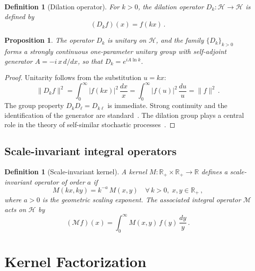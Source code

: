 \documentclass[12pt]{article}
\newtheorem{proposition}[theorem]{Proposition}
\newtheorem{definition}[theorem]{Definition}
\begin{document}
\begin{definition}[Dilation operator]\label{def:dilation}
For $k > 0$, the \emph{dilation operator} $D_k: \mathcal{H} \to \mathcal{H}$ is defined by
\begin{equation}\label{eq:dilation}
(D_k f)(x) = f(kx)\,.
\end{equation}
\end{definition}

\begin{proposition}\label{prop:unitary}
The operator $D_k$ is unitary on $\mathcal{H}$, and the family $\{D_k\}_{k>0}$ forms a strongly continuous one-parameter unitary group with self-adjoint generator $A = -i\, x\, d/dx$, so that $D_k = e^{iA\ln k}$.
\end{proposition}

\begin{proof}
Unitarity follows from the substitution $u = kx$:
\[
\|D_k f\|^2 = \int_0^\infty |f(kx)|^2\, \frac{dx}{x} = \int_0^\infty |f(u)|^2\, \frac{du}{u} = \|f\|^2\,.
\]
The group property $D_k D_\ell = D_{k\ell}$ is immediate. Strong continuity and the identification of the generator are standard~\cite{ReedSimon1978}. The dilation group plays a central role in the theory of self-similar stochastic processes~\cite{EmbrechtsMaejima2002}.
\end{proof}


\subsection{Scale-invariant integral operators}

\begin{definition}[Scale-invariant kernel]\label{def:scaleinv}
A kernel $M: \mathbb{R}_+ \times \mathbb{R}_+ \to \mathbb{R}$ defines a \emph{scale-invariant operator of order $a$} if
\begin{equation}\label{eq:scaleinv}
M(kx,ky) = k^{-a}\, M(x,y) \quad \forall\, k > 0,\; x,y \in \mathbb{R}_+\,,
\end{equation}
where $a > 0$ is the \emph{geometric scaling exponent}. The associated integral operator $\mathcal{M}$ acts on $\mathcal{H}$ by
\[
(\mathcal{M} f)(x) = \int_0^\infty M(x,y)\, f(y)\, \frac{dy}{y}\,.
\]
\end{definition}


\section{Kernel Factorization}\label{sec:factorization}
\end{document}
